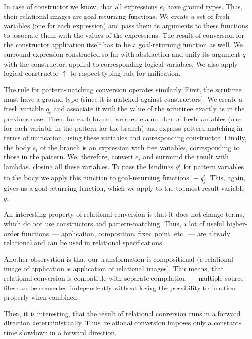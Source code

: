 In case of constructor we know, that all expressions $e_i$ have ground types. Thus, their relational images are goal-returning
functions. We create a set of fresh variables (one for each expression) and pass them as arguments to these functions to associate
them with the values of the expressions. The result of conversion for the constructor application itself has to be a 
goal-returning function as well. We surround expression constructed so far with abstraction and unify its argument $q$ with the
constructor, applied to corresponding logical variables. We also apply logical constructor $\uparrow$ to respect typing rule
for unification.

The rule for pattern-matching conversion operates similarly. First, the scrutinee must have a ground type (since it is matched against
constructors). We create a fresh variable $q_e$ and associate it with the value of the scrutinee exactly as in the previous
case. Then, for each branch we create a number of fresh variables (one for each variable in the pattern for the branch) and
express pattern-matching in terms of unification, using these variables and corresponding constructor. Finally, the body $e_i$ of the branch
is an expression with free variables, corresponding to those in the pattern. We, therefore, convert $e_i$ and surround the result with
lambdas, closing all these variables. To pass the bindings $q^i_j$ for pattern variables to the body we apply this function to
goal-returning functions $\equiv q^i_j$. This, again, gives us a goal-returning function, which we apply to the topmost result variable $q$.

An interesting property of relational conversion is that it does not change terms, which do not use constructors and pattern-matching. Thus,
a lot of useful higher-order functions~--- application, composition, fixed point, etc.~--- are already relational and can be used in
relational specifications.

Another observation is that our transformation is compositional (a relational image of application is application of relational
images). This means, that relational conversion is compatible with separate compilation~--- multiple source files can be
converted independently without losing the possibility to function properly when combined.

Then, it is interesting, that the result of relational conversion runs in a forward direction
deterministically. Thus, relational conversion imposes only a constant-time slowdown in a forward
direction.

